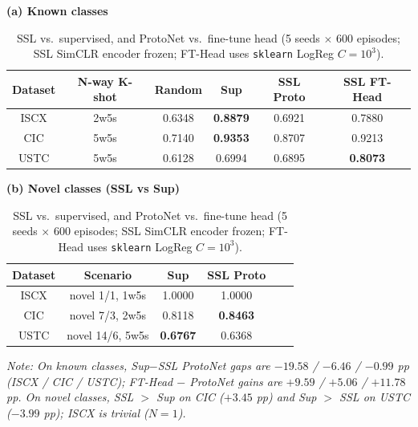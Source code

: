 \documentclass[sensors,article,submit,moreauthors]{Definitions/mdpi}
\begin{document}
\begin{table}[H]
\centering
\small
\caption{SSL vs.\ supervised, and ProtoNet vs.\ fine-tune head (5 seeds $\times$ 600 episodes; SSL SimCLR encoder frozen; FT-Head uses \texttt{sklearn} LogReg $C = 10^3$).}
\label{tab:supssl_fthead}
\setlength{\tabcolsep}{4pt}
\begin{center}
\textbf{(a) Known classes}\\[0.3ex]
\begin{tabular}{cccccc}
\toprule
Dataset & N-way K-shot & Random & Sup & SSL Proto & SSL FT-Head \\
\midrule
ISCX & 2w5s & 0.6348 & \textbf{0.8879} & 0.6921 & 0.7880 \\
CIC  & 5w5s & 0.7140 & \textbf{0.9353} & 0.8707 & 0.9213 \\
USTC & 5w5s & 0.6128 & 0.6994 & 0.6895 & \textbf{0.8073} \\
\bottomrule
\end{tabular}

\vspace{0.7ex}

\textbf{(b) Novel classes (SSL vs Sup)}\\[0.3ex]
\begin{tabular}{cccccc}
\toprule
Dataset & Scenario & Sup & SSL Proto \\
\midrule
ISCX & novel 1/1, 1w5s & 1.0000 & 1.0000 \\
CIC  & novel 7/3, 2w5s & 0.8118 & \textbf{0.8463} \\
USTC & novel 14/6, 5w5s & \textbf{0.6767} & 0.6368 \\
\bottomrule
\end{tabular}
\end{center}

\vspace{0.5ex}

\noindent\textit{Note: On known classes, Sup$-$SSL ProtoNet gaps are $-19.58$ / $-6.46$ / $-0.99$ pp (ISCX / CIC / USTC); FT-Head $-$ ProtoNet gains are $+9.59$ / $+5.06$ / $+11.78$ pp. On novel classes, SSL $>$ Sup on CIC ($+3.45$ pp) and Sup $>$ SSL on USTC ($-3.99$ pp); ISCX is trivial ($N = 1$).}
\end{table}
\end{document}
